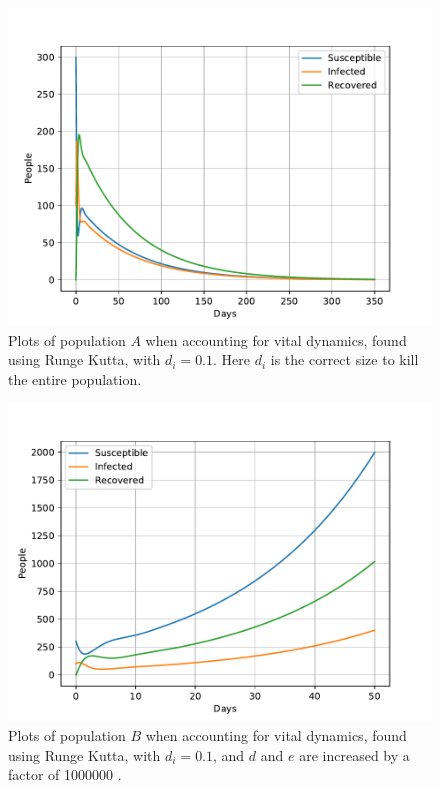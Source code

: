 \documentclass[a4paper]{article}
\begin{document}
	\begin{figure}[!htb]
		\centering 
		\includegraphics[scale=0.56]{../plots/opp_c_k2l.pdf}	
		\caption{Plots of population $A$ when accounting for vital dynamics, found using Runge Kutta, with $d_i=0.1$. Here $d_i$ is the correct size to kill the entire population. }
		\label{opp_c1}
	\end{figure}
	
	\begin{figure}[!htb]
		\centering 
		\includegraphics[scale=0.56]{../plots/opp_c_h_100000.pdf} %
		\caption{Plots of population $B$  when accounting for vital dynamics, found using Runge Kutta, with $d_i=0.1$, and $d$ and $e$ are increased by a factor of 
			1000000 
			.}
		\label{opp_c2}
	\end{figure}
	
\end{document}

